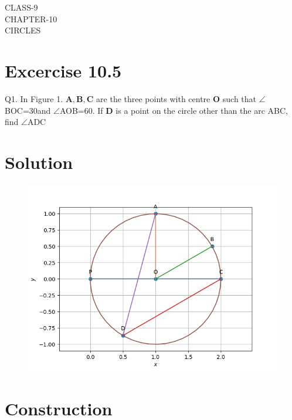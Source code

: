 \documentclass[12pt]{article}
\let\vec\mathbf
\begin{document}
\begin{center}
\textbf\large{CLASS-9\\CHAPTER-10 \\ CIRCLES}

\end{center}
\section*{Excercise 10.5}

Q1. In Figure 1. $\vec{A,B,C}$ are the three points with centre $\vec{O}$ such that $\angle$BOC=30\degree and $\angle$AOB=60\degree. If $\vec{D}$ is a point on the circle other than the arc ABC, find $\angle$ADC
\section*{\large Solution}
\begin{figure}[h!]
\centering
\includegraphics[width=\columnwidth]{figs/circle2.png}
\caption{}
\end{figure}
\section*{\large Construction}
\end{document}
